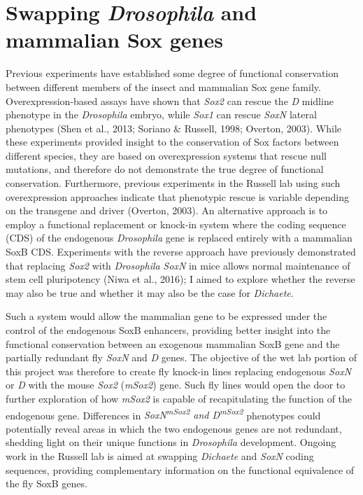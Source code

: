 \documentclass[withindex,glossary]{cam-thesis}
\begin{document}
\chapter{Swapping \emph{Drosophila} and mammalian Sox genes}

Previous experiments have established some degree of functional
conservation between different members of the insect and mammalian Sox
gene family. Overexpression-based assays have shown that \emph{Sox2} can
rescue the \emph{D} midline phenotype in the \emph{Drosophila} embryo,
while \emph{Sox1} can rescue \emph{SoxN} lateral phenotypes (Shen et
al., 2013; Soriano \& Russell, 1998; Overton, 2003). While these
experiments provided insight to the conservation of Sox factors between
different species, they are based on overexpression systems that rescue
null mutations, and therefore do not demonstrate the true degree of
functional conservation. Furthermore, previous experiments in the
Russell lab using such overexpression approaches indicate that
phenotypic rescue is variable depending on the transgene and driver
(Overton, 2003). An alternative approach is to employ a functional
replacement or knock-in system where the coding sequence (\gls{CDS}) of the
endogenous \emph{Drosophila} gene is replaced entirely with a mammalian
SoxB CDS. Experiments with the reverse approach have previously
demonstrated that replacing \emph{Sox2} with \emph{Drosophila}
\emph{SoxN} in mice allows normal maintenance of stem cell pluripotency
(Niwa et al., 2016); I aimed to explore whether the reverse may also be
true and whether it may also be the case for \emph{Dichaete}.

Such a system would allow the mammalian gene to be expressed under the
control of the endogenous SoxB enhancers, providing better insight into
the functional conservation between an exogenous mammalian SoxB gene and
the partially redundant fly \emph{SoxN} and \emph{D} genes. The
objective of the wet lab portion of this project was therefore to create
fly knock-in lines replacing endogenous \emph{SoxN} or \emph{D} with the
mouse \emph{Sox2} (\emph{mSox2}) gene. Such fly lines would open the
door to further exploration of how \emph{mSox2} is capable of
recapitulating the function of the endogenous gene. Differences in
\emph{SoxN\textsuperscript{mSox2} and D\textsuperscript{mSox2}}
phenotypes could potentially reveal areas in which the two endogenous
genes are not redundant, shedding light on their unique functions in
\emph{Drosophila} development. Ongoing work in the Russell lab is aimed
at swapping \emph{Dichaete} and \emph{SoxN} coding sequences, providing
complementary information on the functional equivalence of the fly SoxB
genes.
\end{document}
